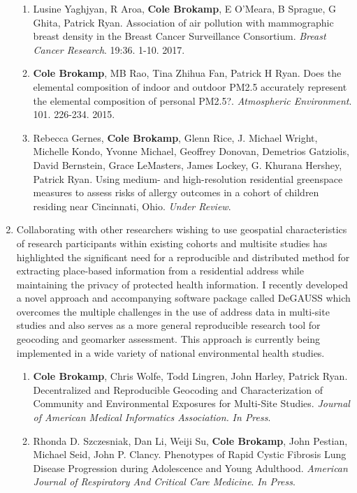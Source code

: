 \documentclass{nihbiosketch}
\begin{document}
\begin{enumerate}
\begin{enumerate}
	\item Lusine Yaghjyan, R Aroa, \textbf{Cole Brokamp}, E O'Meara, B Sprague, G Ghita, Patrick Ryan. Association of air pollution with mammographic breast density in the Breast Cancer Surveillance Consortium. \emph{Breast Cancer Research}. 19:36. 1-10. 2017.
	
	\item \textbf{Cole Brokamp}, MB Rao, Tina Zhihua Fan, Patrick H Ryan. Does the elemental composition of indoor and outdoor PM2.5 accurately represent the elemental composition of personal PM2.5?. \emph{Atmospheric Environment}. 101. 226-234. 2015.
	
	\item Rebecca Gernes, \textbf{Cole Brokamp}, Glenn Rice, J. Michael Wright,
	Michelle Kondo, Yvonne Michael, Geoffrey Donovan, Demetrios Gatziolis,
	David Bernstein, Grace LeMasters, James Lockey, G. Khurana Hershey,
	Patrick Ryan. Using medium- and high-resolution residential greenspace
	measures to assess risks of allergy outcomes in a cohort of children
	residing near Cincinnati, Ohio. \emph{Under Review}.
	
\end{enumerate}

\item Collaborating with other researchers wishing to use geospatial characteristics of research participants within existing cohorts and multisite studies has highlighted the significant need for a reproducible and distributed method for extracting place-based information from a residential address while maintaining the privacy of protected health information. I recently developed a novel approach and accompanying software package called DeGAUSS which overcomes the multiple challenges in the use of address data in multi-site studies and also serves as a more general reproducible research tool for geocoding and geomarker assessment. This approach is currently being implemented in a wide variety of national environmental health studies.

\begin{enumerate}

	\item \textbf{Cole Brokamp}, Chris Wolfe, Todd Lingren, John Harley, Patrick Ryan. Decentralized and Reproducible Geocoding and Characterization of Community and Environmental Exposures for Multi-Site Studies. \emph{Journal of American Medical Informatics Association.} \emph{In Press}.
	
	\item Rhonda D. Szczesniak, Dan Li, Weiji Su, \textbf{Cole Brokamp}, John Pestian, Michael Seid, John P. Clancy. Phenotypes of Rapid Cystic Fibrosis Lung Disease Progression during Adolescence and Young Adulthood. \emph{American Journal of Respiratory And Critical Care Medicine}. \emph{In Press}.
	

\end{enumerate}
\end{enumerate}
\end{document}
